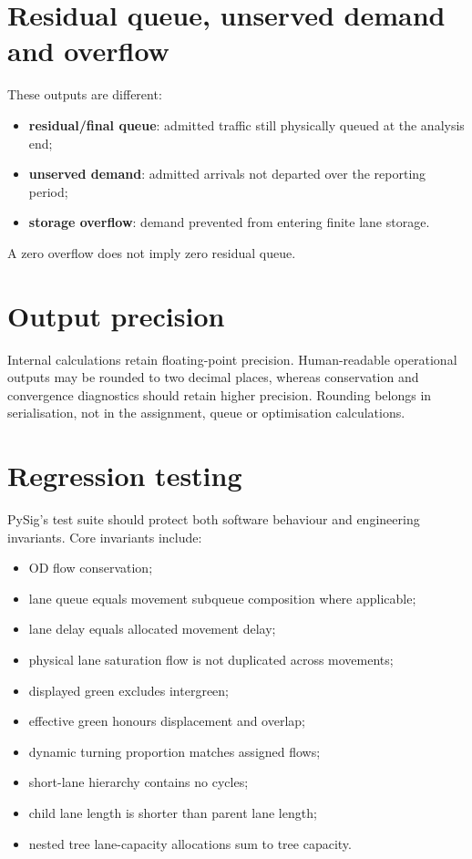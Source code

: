 \section{Residual queue, unserved demand and overflow}
These outputs are different:
\begin{itemize}
\item \textbf{residual/final queue}: admitted traffic still physically queued at the
      analysis end;
\item \textbf{unserved demand}: admitted arrivals not departed over the reporting
      period;
\item \textbf{storage overflow}: demand prevented from entering finite lane storage.
\end{itemize}
A zero overflow does not imply zero residual queue.

\section{Output precision}
Internal calculations retain floating-point precision.  Human-readable operational
outputs may be rounded to two decimal places, whereas conservation and convergence
diagnostics should retain higher precision.  Rounding belongs in serialisation, not in
the assignment, queue or optimisation calculations.

\section{Regression testing}
PySig's test suite should protect both software behaviour and engineering invariants.
Core invariants include:
\begin{itemize}
\item OD flow conservation;
\item lane queue equals movement subqueue composition where applicable;
\item lane delay equals allocated movement delay;
\item physical lane saturation flow is not duplicated across movements;
\item displayed green excludes intergreen;
\item effective green honours displacement and overlap;
\item dynamic turning proportion matches assigned flows;
\item short-lane hierarchy contains no cycles;
\item child lane length is shorter than parent lane length;
\item nested tree lane-capacity allocations sum to tree capacity.
\end{itemize}


